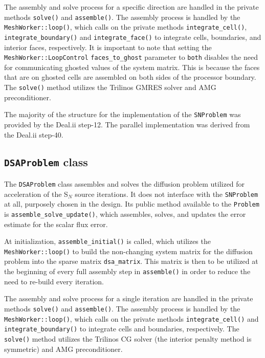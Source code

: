 \documentclass{article}
\begin{document}
The assembly and solve process for a specific direction are handled in the private methods \texttt{solve()} and \texttt{assemble()}. The assembly process is handled by the \texttt{MeshWorker::loop()}, which calls on the private methods \texttt{integrate\_cell()}, \texttt{integrate\_boundary()} and \texttt{integrate\_face()} to integrate cells, boundaries, and interior faces, respectively. It is important to note that setting the \texttt{MeshWorker::LoopControl} \texttt{faces\_to\_ghost} parameter to \texttt{both} disables the need for communicating ghosted values of the system matrix. This is because the faces that are on ghosted cells are assembled on both sides of the processor boundary. The \texttt{solve()} method utilizes the Trilinos GMRES solver and AMG preconditioner.

The majority of the structure for the implementation of the \texttt{SNProblem} was provided by the Deal.ii step-12. The parallel implementation was derived from the Deal.ii step-40.

\subsection{\texttt{DSAProblem} class}

The \texttt{DSAProblem} class assembles and solves the diffusion problem utilized for acceleration of the S$_N$ source iterations. It does not interface with the \texttt{SNProblem} at all, purposely chosen in the design. Its public method available to the \texttt{Problem} is \texttt{assemble\_solve\_update()}, which assembles, solves, and updates the error estimate for the scalar flux error. 

At initialization, \texttt{assemble\_initial()} is called, which utilizes the \texttt{MeshWorker::loop()} to build the non-changing system matrix for the diffusion problem into the sparse matrix \texttt{dsa\_matrix}. This matrix is then to be utilized at the beginning of every full assembly step in \texttt{assemble()} in order to reduce the need to re-build every iteration.

The assembly and solve process for a single iteration are handled in the private methods \texttt{solve()} and \texttt{assemble()}. The assembly process is handled by the \texttt{MeshWorker::loop()}, which calls on the private methods \texttt{integrate\_cell()} and \texttt{integrate\_boundary()} to integrate cells and boundaries, respectively. The \texttt{solve()} method utilizes the Trilinos CG solver (the interior penalty method is symmetric) and AMG preconditioner.
\end{document}
